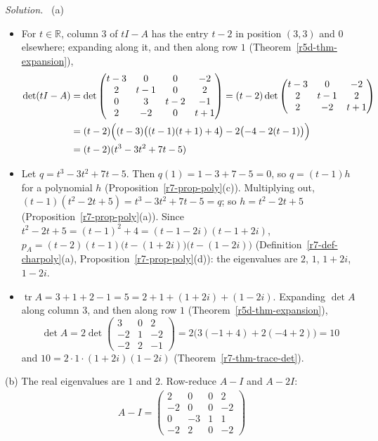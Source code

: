 \documentclass[12pt]{article}
\newcommand{\R}{\mathbb R}
\DeclareMathOperator{\tr}{tr}
\theoremstyle{definition}
\newenvironment{solution}{\par\noindent\textit{Solution.}\ }{\par\smallskip}
\begin{document}
\begin{solution}
(a)
\begin{itemize}
\item For \(t\in\R\), column \(3\) of \(tI-A\) has the entry \(t-2\) in position \((3,3)\) and \(0\) elsewhere; expanding
along it, and then along row \(1\) (Theorem~\ref{r5d-thm-expansion}),
\[
\begin{aligned}
\det(tI-A)&=\det\begin{pmatrix}t-3&0&0&-2\\2&t-1&0&2\\0&3&t-2&-1\\2&-2&0&t+1\end{pmatrix}
=(t-2)\det\begin{pmatrix}t-3&0&-2\\2&t-1&2\\2&-2&t+1\end{pmatrix}\\
&=(t-2)\Bigl((t-3)\bigl((t-1)(t+1)+4\bigr)-2\bigl(-4-2(t-1)\bigr)\Bigr)\\
&=(t-2)(t^3-3t^2+7t-5)
\end{aligned}
\]
\item Let \(q=t^3-3t^2+7t-5\). Then \(q(1)=1-3+7-5=0\), so \(q=(t-1)h\) for a polynomial \(h\)
(Proposition~\ref{r7-prop-poly}(c)). Multiplying out, \((t-1)(t^2-2t+5)=t^3-3t^2+7t-5=q\); so \(h=t^2-2t+5\)
(Proposition~\ref{r7-prop-poly}(a)). Since \(t^2-2t+5=(t-1)^2+4=(t-1-2i)(t-1+2i)\),
\(p_A=(t-2)(t-1)\bigl(t-(1+2i)\bigr)\bigl(t-(1-2i)\bigr)\) (Definition~\ref{r7-def-charpoly}(a),
Proposition~\ref{r7-prop-poly}(d)): the eigenvalues are \(2\), \(1\), \(1+2i\), \(1-2i\).
\item \(\tr A=3+1+2-1=5=2+1+(1+2i)+(1-2i)\). Expanding \(\det A\) along column \(3\), and then along row \(1\)
(Theorem~\ref{r5d-thm-expansion}),
\[
\det A=2\det\begin{pmatrix}3&0&2\\-2&1&-2\\-2&2&-1\end{pmatrix}=2\bigl(3(-1+4)+2(-4+2)\bigr)=10
\]
and \(10=2\cdot1\cdot(1+2i)(1-2i)\) (Theorem~\ref{r7-thm-trace-det}).
\end{itemize}
(b) The real eigenvalues are \(1\) and \(2\). Row-reduce \(A-I\) and \(A-2I\):
\[
\begin{gathered}
A-I=\begin{pmatrix}2&0&0&2\\-2&0&0&-2\\0&-3&1&1\\-2&2&0&-2\end{pmatrix}

\end{gathered}\]
\end{solution}
\end{document}
